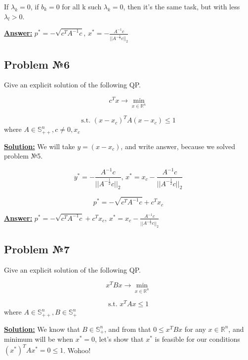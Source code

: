 If $\lambda_k = 0$, if $b_k = 0$ for all k such $\lambda_k = 0$, then it's the same task, but with less $\lambda_l > 0$.

\underline{\textbf{Answer:}} $p^* = - \sqrt{c^TA^{-1}c}$, $x^* = - \frac{A^{-1}c}{||A^{-\frac{1}{2}} c ||_2}$

\subsection{Problem №6}
Give an explicit solution of the following QP.

\begin{equation*}
    c^T x  \xrightarrow{} \min\limits_{x \in \mathds{R}^n}
\end{equation*}

\begin{equation*}
   \text{s.t. } (x-x_c)^TA(x-x_c) \leq 1
\end{equation*}
where $A \in \mathds{S}_{++}^n, c \not = 0, x_c$

\underline{\textbf{Solution:}}
We will take $y = (x-x_c)$, and write answer, because we solved problem №5.

\begin{equation*}
y^* = -\frac{A^{-1}c}{||A^{-\frac{1}{2}} c ||_2}\text{, } x^* = x_c -\frac{A^{-1}c}{||A^{-\frac{1}{2}} c ||_2}
\end{equation*}

\begin{equation*}
    p^* = - \sqrt{c^TA^{-1}c} + c^Tx_c
\end{equation*} 

\underline{\textbf{Answer:}} $p^* = - \sqrt{c^TA^{-1}c} + c^Tx_c$, $x^* = x_c -\frac{A^{-1}c}{||A^{-\frac{1}{2}} c ||_2}$

\subsection{Problem №7}
Give an explicit solution of the following QP.

\begin{equation*}
    x^TBx  \xrightarrow{} \min\limits_{x \in \mathds{R}^n}
\end{equation*}

\begin{equation*}
   \text{s.t. } x^TAx \leq 1
\end{equation*}
where $A \in \mathds{S}_{++}^n, B \in \mathds{S}_+^n$

\underline{\textbf{Solution:}}
We know that $B \in \mathds{S}_+^n$, and from that $0 \leq x^TBx$ for any $x \in \mathds{R}^n$, and minimum will be when $x^* = 0$, let's show that $x^*$ is feasible for our conditions $(x^*)^TAx^* = 0 \leq 1$. 
Wohoo!

